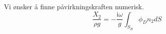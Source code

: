 Vi ønsker å finne påvirkningskraften numerisk. 
\begin{equation}
\frac{X_2}{\rho g}  =  -  \frac{\mathrm{i} \omega}{g}\int_{S_B}   \phi_D n_2dS
\end{equation}
